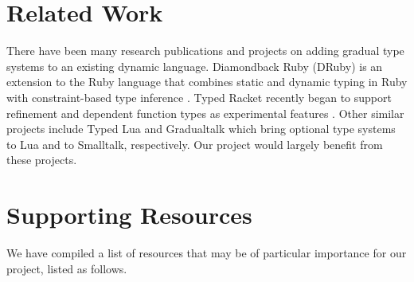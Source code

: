 \section{Related Work}
There have been many research publications and projects on adding gradual type
systems to an existing dynamic language. Diamondback Ruby (DRuby) is an
extension to the Ruby language that combines static and dynamic typing in Ruby
with constraint-based type inference \cite{furr2009combining}. Typed Racket
\cite{tobin2006interlanguage} recently began to support refinement and dependent
function types as experimental features \cite{racket2017refinement}. Other
similar projects include Typed Lua \cite{maidl2014typed} and Gradualtalk
\cite{allende2014gradual} which bring optional type systems to Lua and to
Smalltalk, respectively. Our project would largely benefit from these projects.

\section{Supporting Resources}
\label{sec-supporting-resources}
We have compiled a list of resources that may be of particular importance for
our project, listed as follows.

